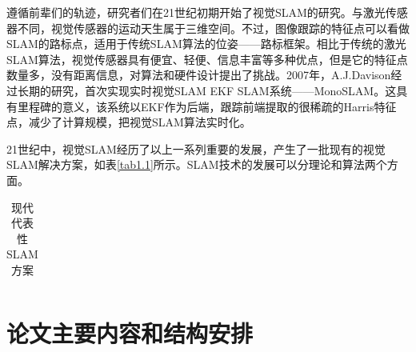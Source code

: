遵循前辈们的轨迹，研究者们在21世纪初期开始了视觉SLAM的研究。与激光传感器不同，视觉传感器的运动天生属于三维空间。不过，图像跟踪的特征点可以看做SLAM的路标点，适用于传统SLAM算法的位姿——路标框架。相比于传统的激光SLAM算法，视觉传感器具有便宜、轻便、信息丰富等多种优点，但是它的特征点数量多，没有距离信息，对算法和硬件设计提出了挑战。2007年，A.J.Davison经过长期的研究，首次实现实时视觉SLAM EKF SLAM系统——MonoSLAM。这具有里程碑的意义，该系统以EKF作为后端，跟踪前端提取的很稀疏的Harris特征点，减少了计算规模，把视觉SLAM算法实时化。

21世纪中，视觉SLAM经历了以上一系列重要的发展，产生了一批现有的视觉SLAM解决方案，如表\ref{tab1.1}所示。SLAM技术的发展可以分理论和算法两个方面。




\begin{table}[h]		%
\newcommand{\tabincell}[2]{\begin{tabular}{@{}#1@{}}#2\end{tabular}}		%
\renewcommand\arraystretch{1.5}		%
\centering
\caption{现代代表性SLAM方案}   %
\label{tab3.1}
	\begin{tabular*}{0.9\textwidth}{@{\extracolsep{\fill}}ccc}  %
	
	\end{tabular*}
\end{table}


\section{论文主要内容和结构安排}

